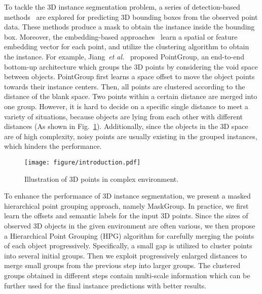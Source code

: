\documentclass{article}
\newcommand{\etal}{\emph{et al.}}
\begin{document}
To tackle the 3D instance segmentation problem,
a series of detection-based  methods~\cite{3dbonet, 3dsis} are explored for predicting 3D bounding boxes from the observed point data. These methods produce a mask to obtain the instance inside the bounding box.
Moreover, the embedding-based approaches~\cite{jsis3d,asis,3dmpa,pointgroup,occseg} learn a spatial or feature embedding vector for each point, and utilize the clustering algorithm to obtain the instance.
For example, Jiang~\etal~\cite{pointgroup} proposed PointGroup, an end-to-end bottom-up architecture which groups the 3D points by considering the void space between objects. PointGroup first learns a space offset to move the object points towards their instance centers.
Then, all points are clustered according to the distance of the blank space. Two points within a certain distance are merged into one group. 
However, it is hard to decide on a specific single distance to meet a variety of situations, because objects are lying from each other with different distances (As shown in Fig.~\ref{fig:intro}). Additionally, since the objects in the 3D space are of high complexity, noisy points are usually existing in the grouped instances, which hinders the performance.

\begin{figure}[t!]
	\begin{center}
		\texttt{[image: figure/introduction.pdf]}
	\end{center}
	\vspace{-7mm}
	\caption{Illustration of 3D points in complex environment.}
	\label{fig:intro}
	\vspace{-6mm}
\end{figure}

To enhance the performance of 3D instance segmentation, we present a masked hierarchical point grouping approach, namely MaskGroup. In practice, we first learn the offsets and semantic labels for the input 3D points. Since the sizes of observed 3D objects in the given environment are often various, we then propose a Hierarchical Point Grouping (HPG) algorithm for carefully merging the points of each object progressively. Specifically, a small gap is utilized to cluster points into several initial groups. Then we exploit progressively enlarged distances to merge small groups from the previous step into larger groups. The clustered groups obtained in different steps contain multi-scale information which can be further used for the final instance predictions with better results.
\end{document}
